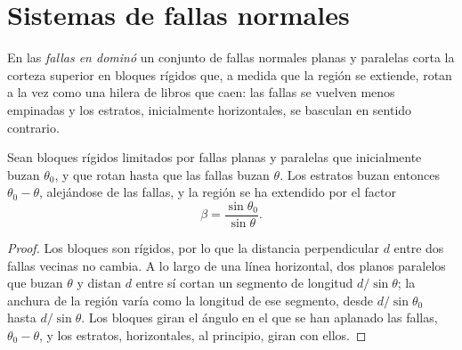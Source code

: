 \begin{omfigure}
\par{}\label{fig:b3:extension-strike-slip:models}
\end{omfigure}

\section{Sistemas de fallas normales}\label{sec:b3:extension-strike-slip:faults}

\begin{definition}\label{def:b3:extension-strike-slip:domino}
En las \emph{fallas en dominó} un conjunto de
fallas normales planas y paralelas corta la corteza superior en bloques rígidos que, a medida que la región
se extiende, rotan a la vez como una hilera de libros que caen: las fallas se vuelven
menos empinadas y los estratos, inicialmente horizontales, se basculan en sentido contrario.
\end{definition}

\begin{theorem}\label{thm:b3:extension-strike-slip:domino}
Sean bloques rígidos limitados por fallas planas y paralelas que inicialmente buzan
$\theta_0$, y que rotan hasta que las fallas buzan $\theta$. Los estratos buzan entonces $\theta_0
- \theta$, alejándose de las fallas, y la región se ha extendido por el
factor
\[
  \beta = \frac{\sin\theta_0}{\sin\theta} .
\]
\end{theorem}

\begin{proof}
Los bloques son rígidos, por lo que la distancia perpendicular $d$ entre dos
fallas vecinas no cambia. A lo largo de una línea horizontal, dos planos paralelos
que buzan $\theta$ y distan $d$ entre sí cortan un segmento de longitud $d/\sin
\theta$; la anchura de la región varía como la longitud de ese segmento, desde
$d/\sin\theta_0$ hasta $d/\sin\theta$. Los bloques giran el ángulo en el que
se han aplanado las fallas, $\theta_0 - \theta$, y los estratos, horizontales,
al principio, giran con ellos.
\end{proof}


